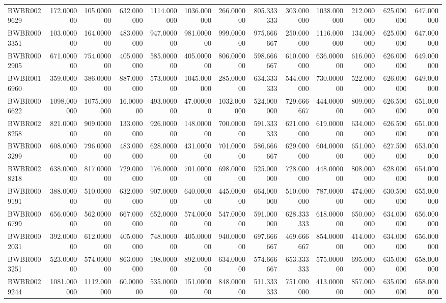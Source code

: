 \begin{longtable}{lrrrrrrrrrrrr}
BWBR0029629 & 172.000000 & 105.000000 & 632.000000 & 1114.000000 & 1036.000000 & 266.000000 & 805.333333 & 303.000000 & 1038.000000 & 212.000000 & 625.000000 & 647.000000 \\
BWBR0003351 & 103.000000 & 164.000000 & 483.000000 & 947.000000 & 981.000000 & 999.000000 & 975.666667 & 250.000000 & 1116.000000 & 134.000000 & 625.000000 & 647.000000 \\
BWBR0002905 & 671.000000 & 754.000000 & 405.000000 & 585.000000 & 405.000000 & 806.000000 & 598.666667 & 610.000000 & 636.000000 & 616.000000 & 626.000000 & 649.000000 \\
BWBR0016960 & 359.000000 & 386.000000 & 887.000000 & 573.000000 & 1045.000000 & 285.000000 & 634.333333 & 544.000000 & 730.000000 & 522.000000 & 626.000000 & 649.000000 \\
BWBR0006622 & 1098.000000 & 1075.000000 & 16.000000 & 493.000000 & 47.000000 & 1032.000000 & 524.000000 & 729.666667 & 444.000000 & 809.000000 & 626.500000 & 651.000000 \\
BWBR0028258 & 821.000000 & 909.000000 & 133.000000 & 926.000000 & 148.000000 & 700.000000 & 591.333333 & 621.000000 & 619.000000 & 634.000000 & 626.500000 & 651.000000 \\
BWBR0003299 & 608.000000 & 796.000000 & 483.000000 & 628.000000 & 431.000000 & 701.000000 & 586.666667 & 629.000000 & 604.000000 & 651.000000 & 627.500000 & 653.000000 \\
BWBR0028218 & 638.000000 & 817.000000 & 729.000000 & 176.000000 & 701.000000 & 698.000000 & 525.000000 & 728.000000 & 448.000000 & 808.000000 & 628.000000 & 654.000000 \\
BWBR0009191 & 388.000000 & 510.000000 & 632.000000 & 907.000000 & 640.000000 & 445.000000 & 664.000000 & 510.000000 & 787.000000 & 474.000000 & 630.500000 & 655.000000 \\
BWBR0006799 & 656.000000 & 562.000000 & 667.000000 & 652.000000 & 574.000000 & 547.000000 & 591.000000 & 628.333333 & 618.000000 & 650.000000 & 634.000000 & 656.000000 \\
BWBR0002031 & 392.000000 & 612.000000 & 405.000000 & 748.000000 & 405.000000 & 940.000000 & 697.666667 & 469.666667 & 854.000000 & 414.000000 & 634.000000 & 656.000000 \\
BWBR0003251 & 523.000000 & 574.000000 & 863.000000 & 198.000000 & 892.000000 & 634.000000 & 574.666667 & 653.333333 & 575.000000 & 695.000000 & 635.000000 & 658.000000 \\
BWBR0029244 & 1081.000000 & 1112.000000 & 60.000000 & 535.000000 & 151.000000 & 848.000000 & 511.333333 & 751.000000 & 413.000000 & 857.000000 & 635.000000 & 658.000000 \\

\end{longtable}
